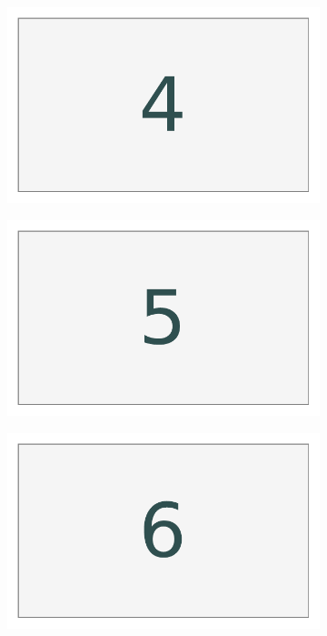 \begin{figure}[H]
\begin{framed}
\begin{subfigure}{.32\textwidth}
\end{subfigure}
\\
\begin{subfigure}{.32\textwidth}
    \centering
    \includegraphics[width=\linewidth]{figures/layout_4.pdf}
\end{subfigure}
%
\begin{subfigure}{.32\textwidth}
    \centering
    \includegraphics[width=\linewidth]{figures/layout_5.pdf}
\end{subfigure}
%
\begin{subfigure}{.32\textwidth}
    \centering
    \includegraphics[width=\linewidth]{figures/layout_6.pdf}

\end{subfigure}
\end{framed}
\end{figure}
